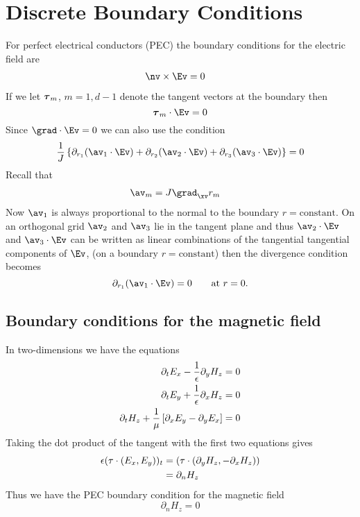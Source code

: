 \section{Discrete Boundary Conditions}

\newcommand{\pra}{\partial_{r_1}}
\newcommand{\prb}{\partial_{r_2}}
\newcommand{\prc}{\partial_{r_3}}

For perfect electrical conductors (PEC) the boundary conditions for the electric field are
\begin{align}
  \nv\times\Ev & = 0
\end{align}
If we let $\boldsymbol{\tau}_m$, $m=1,d-1$ denote the tangent vectors at the boundary then
\[
  \tauv_m\cdot\Ev=0
\]
Since $\grad\cdot\Ev=0$ we can also use the condition
\[
  {1\over J}\left\{ \pra( \av_1\cdot\Ev) + \prb( \av_2\cdot\Ev) + \prc( \av_3\cdot\Ev) \right\} =0
\]
Recall that
\begin{align*}
   \av_m &= J \grad_{\xv} r_m
\end{align*}
Now $\av_1$ is always proportional to the normal to the boundary $r=\mbox{constant}$. 
On an orthogonal grid $\av_2$ and $\av_3$ lie in the tangent plane and thus
$\av_2\cdot\Ev$ and $\av_3\cdot\Ev$ can be written as linear combinations of the
tangential tangential components of $\Ev$, (on a boundary $r=\mbox{constant}$) then
the divergence condition becomes
\[
  \pra( \av_1\cdot\Ev ) =0 \qquad \mbox{at $r=0$}.
\]

\subsection{Boundary conditions for the magnetic field}

In two-dimensions we have the equations
\begin{align*}
\partial_t E_x - {1\over \epsilon} \partial_y H_z &=0 \\
\partial_t E_y + {1\over \epsilon} \partial_x H_z &=0 \\
\partial_t H_z + {1\over \mu } \left[ \partial_x E_y - \partial_y E_x \right] &=0 
\end{align*}
Taking the dot product of the tangent with the first two equations gives
\begin{align*}
  \epsilon (\tau\cdot(E_x,E_y))_t & = ( \tau\cdot(\partial_y H_z,-\partial_x H_z) ) \\
                              & = \partial_n H_z
\end{align*}
Thus we have the PEC boundary condition for the magnetic field
\[
   \partial_n H_z = 0 
\]

